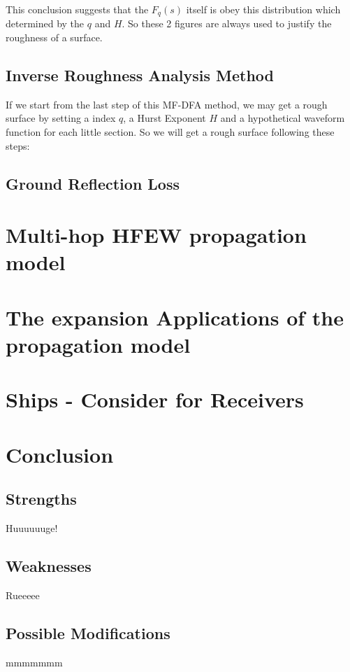 \documentclass{mcmthesis}
\begin{document}
    This conclusion suggests that the $F_q(s)$ itself is obey this distribution which determined by the $q$ and $H$. So these 2 figures are always used to justify the roughness of a surface.

  \subsection{Inverse Roughness Analysis Method}

    If we start from the last step of this MF-DFA method, we may get a rough surface by setting a index $q$, a Hurst Exponent $H$ and a hypothetical waveform function for each little section. So we will get a rough surface following these steps:






  \subsection{Ground Reflection Loss}

\section{Multi-hop HFEW propagation model}



\section{The expansion Applications of the propagation model}

\section{Ships - Consider for Receivers}

\section{Conclusion}
  \subsection{Strengths}
    Huuuuuuge!
  \subsection{Weaknesses}
    Rueeeee
  \subsection{Possible Modifications}
    mmmmmmm
\end{document}
